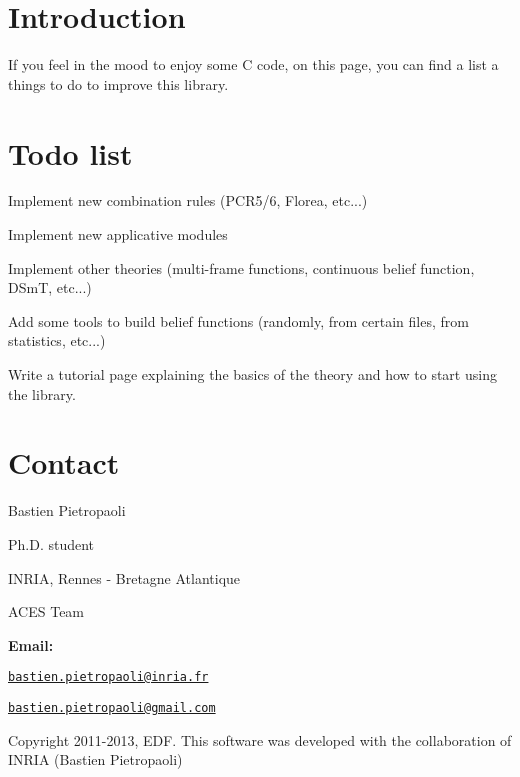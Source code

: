 \hypertarget{_t_o_d_o_TODO_Intro}{}\section{Introduction}\label{_t_o_d_o_TODO_Intro}
If you feel in the mood to enjoy some C code, on this page, you can find a list a things to do to improve this library.\hypertarget{_t_o_d_o_Todo_list}{}\section{Todo list}\label{_t_o_d_o_Todo_list}
\begin{DoxyItemize}
\item Implement new combination rules (PCR5/6, Florea, etc...) \item Implement new applicative modules \item Implement other theories (multi-\/frame functions, continuous belief function, DSmT, etc...) \item Add some tools to build belief functions (randomly, from certain files, from statistics, etc...) \item Write a tutorial page explaining the basics of the theory and how to start using the library.\end{DoxyItemize}
\hypertarget{_t_o_d_o_Todo_contact}{}\section{Contact}\label{_t_o_d_o_Todo_contact}
Bastien Pietropaoli \par
 Ph.D. student \par
 INRIA, Rennes -\/ Bretagne Atlantique \par
 ACES Team \par


{\bfseries Email:} \par
 \href{mailto:bastien.pietropaoli@inria.fr}{\tt bastien.pietropaoli@inria.fr} \par
 \href{mailto:bastien.pietropaoli@gmail.com}{\tt bastien.pietropaoli@gmail.com} \par


Copyright 2011-\/2013, EDF. This software was developed with the collaboration of INRIA (Bastien Pietropaoli) 